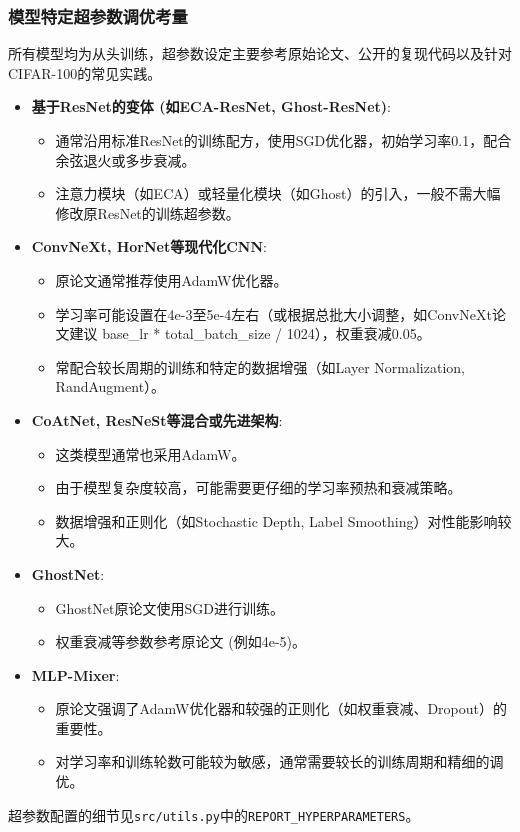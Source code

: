 \documentclass[a4paper]{article}
\begin{document}
\subsubsection{模型特定超参数调优考量}
所有模型均为从头训练，超参数设定主要参考原始论文、公开的复现代码以及针对CIFAR-100的常见实践。
\begin{itemize}
    \item \textbf{基于ResNet的变体 (如ECA-ResNet, Ghost-ResNet)}:
    \begin{itemize}
        \item 通常沿用标准ResNet的训练配方，使用SGD优化器，初始学习率0.1，配合余弦退火或多步衰减。
        \item 注意力模块（如ECA）或轻量化模块（如Ghost）的引入，一般不需大幅修改原ResNet的训练超参数。
    \end{itemize}
    \item \textbf{ConvNeXt, HorNet等现代化CNN}:
    \begin{itemize}
        \item 原论文通常推荐使用AdamW优化器。
        \item 学习率可能设置在4e-3至5e-4左右（或根据总批大小调整，如ConvNeXt论文建议 base\_lr * total\_batch\_size / 1024），权重衰减0.05。
        \item 常配合较长周期的训练和特定的数据增强（如Layer Normalization, RandAugment）。
    \end{itemize}
    \item \textbf{CoAtNet, ResNeSt等混合或先进架构}:
    \begin{itemize}
        \item 这类模型通常也采用AdamW。
        \item 由于模型复杂度较高，可能需要更仔细的学习率预热和衰减策略。
        \item 数据增强和正则化（如Stochastic Depth, Label Smoothing）对性能影响较大。
    \end{itemize}
    \item \textbf{GhostNet}:
    \begin{itemize}
        \item GhostNet原论文使用SGD进行训练。
        \item 权重衰减等参数参考原论文 (例如4e-5)。
    \end{itemize}
    \item \textbf{MLP-Mixer}:
    \begin{itemize}
        \item 原论文强调了AdamW优化器和较强的正则化（如权重衰减、Dropout）的重要性。
        \item 对学习率和训练轮数可能较为敏感，通常需要较长的训练周期和精细的调优。
    \end{itemize}
\end{itemize}
超参数配置的细节见\texttt{src/utils.py}中的\texttt{REPORT\_HYPERPARAMETERS}。
\end{document}
